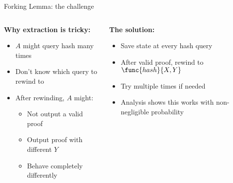 \documentclass[aspectratio=169, lualatex, handout]{beamer}
\begin{document}
\begin{frame}{Forking Lemma: the challenge}
	\begin{columns}[c]
		\begin{column}{0.5\textwidth}
			\textbf{Why extraction is tricky:}
			\begin{itemize}
				\item $A$ might query hash many times
				\item Don't know which query to rewind to
				\item After rewinding, $A$ might:
				      \begin{itemize}
					      \item Not output a valid proof
					      \item Output proof with different $Y$
					      \item Behave completely differently
				      \end{itemize}
			\end{itemize}
		\end{column}
		\begin{column}{0.5\textwidth}
			\textbf{The solution:}
			\begin{itemize}
				\item Save state at every hash query
				\item After valid proof, rewind to $\func{hash}{X, Y}$
				\item Try multiple times if needed
				\item Analysis shows this works with non-negligible probability
			\end{itemize}
		\end{column}
	\end{columns}
\end{frame}
\end{document}

